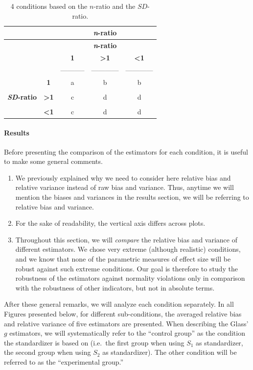 \documentclass[
  english,
  man,floatsintext]{apa6}
\let\oldparagraph\paragraph
\renewcommand{\paragraph}[1]{\oldparagraph{#1}\mbox{}}
\begin{document}
\newpage

\begin{longtable}[]{@{}ccccc@{}}
\caption{4 conditions based on the \(n\)-ratio and the \(SD\)-ratio.}\tabularnewline
\toprule
& & & \textbf{\emph{n}-ratio} & \\
\midrule
\endfirsthead
\toprule
& & & \textbf{\emph{n}-ratio} & \\
\midrule
\endhead
& & \textbf{1} & \textbf{\textgreater1} & \textbf{\textless1} \\
& & ----------- & ------------ & ------------ \\
& \textbf{1} & a & b & b \\
& & & & \\
\textbf{\emph{SD}-ratio} & \textbf{\textgreater1} & c & d & d \\
& & & & \\
& \textbf{\textless1} & c & d & d \\
\bottomrule
\end{longtable}

\hypertarget{results}{%
\paragraph{Results}\label{results}}

Before presenting the comparison of the estimators for each condition, it is useful to make some general comments.

\begin{enumerate}
\def\labelenumi{\arabic{enumi})}
\item
  We previously explained why we need to consider here relative bias and relative variance instead of raw bias and variance. Thus, anytime we will mention the biases and variances in the results section, we will be referring to relative bias and variance.
\item
  For the sake of readability, the vertical axis differs across plots.
\item
  Throughout this section, we will \emph{compare} the relative bias and variance of different estimators. We chose very extreme (although realistic) conditions, and we know that none of the parametric measures of effect size will be robust against such extreme conditions. Our goal is therefore to study the robustness of the estimators against normality violations only in comparison with the robustness of other indicators, but not in absolute terms.
\end{enumerate}

After these general remarks, we will analyze each condition separately. In all Figures presented below, for different sub-conditions, the averaged relative bias and relative variance of five estimators are presented. When describing the Glass' \(g\) estimators, we will systematically refer to the ``control group'' as the condition the standardizer is based on (i.e.~the first group when using \(S_1\) as standardizer, the second group when using \(S_2\) as standardizer). The other condition will be referred to as the ``experimental group.''
\end{document}
